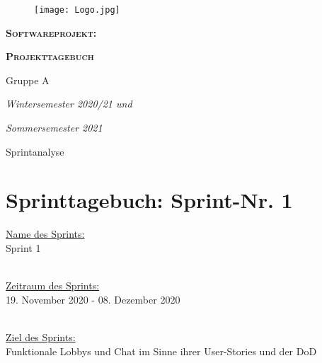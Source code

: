 \documentclass[12pt,a4paper, oneside]{article}
\author{Uni Oldenburg, SWP2020 Gruppe A}
\begin{document}
    \begin{titlepage}
        \pagestyle{empty}
        \begin{center}

            \begin{figure}[h]
                \centering
                \texttt{[image: Logo.jpg]}
            \end{figure}

            \bigskip \bigskip \noindent
            \textsc{\textbf{\LARGE Softwareprojekt:}} \par \bigskip \noindent
            \textsc{\textbf{\LARGE Projekttagebuch}}


            \par \bigskip \bigskip \bigskip \bigskip \bigskip \noindent
            {\Large Gruppe A} \par \medskip \noindent

            \par \bigskip \bigskip \bigskip \bigskip \bigskip \bigskip \noindent
            \textit{\Large Wintersemester 2020/21 und} \par \noindent
            \textit{\Large Sommersemester 2021}

            \par \bigskip \bigskip \bigskip \bigskip \bigskip \bigskip \noindent
            \par \bigskip \bigskip \bigskip \noindent
            {\Large Sprintanalyse} \par \medskip \noindent

        \end{center}
    \end{titlepage}

    \tableofcontents
    \pagebreak



    \section{Sprinttagebuch: Sprint-Nr. 1}
    \underline{Name des Sprints:}
    \\
    Sprint 1

    \noindent
    \\
    \underline{Zeitraum des Sprints:}
    \\
    19. November 2020 - 08. Dezember 2020

    \noindent
    \\
    \underline{Ziel des Sprints:}
    \\
    Funktionale Lobbys und Chat im Sinne ihrer User-Stories und der DoD
\end{document}
